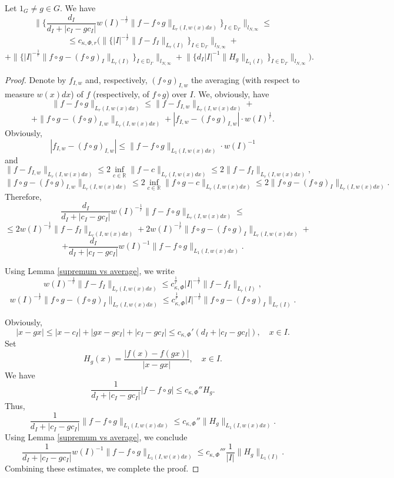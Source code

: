 \documentclass{amsart}
\numberwithin{equation}{section}
\begin{document}
\begin{lemma} Let $1_G\neq g\in G.$ We have
$$\Big\|\Big\{\frac{d_I}{d_I+|c_I-gc_I|}w(I)^{-\frac1r}\|f-f\circ g\|_{L_r(I,w(x)dx)}\Big\}_{I\in\mathbb{D}_{\Gamma}}\Big\|_{l_{N,\infty}}\leq$$
$$\leq c_{\kappa,\Phi,r}\Big(\Big\|\Big\{|I|^{-\frac1r}\|f-f_I\|_{L_r(I)}\Big\}_{I\in\mathbb{D}_{\Gamma}}\Big\|_{l_{N,\infty}}+$$
$$+\Big\|\Big\{|I|^{-\frac1r}\|f\circ g-(f\circ g)_I\|_{L_r(I)}\Big\}_{I\in\mathbb{D}_{\Gamma}}\Big\|_{l_{N,\infty}}+\Big\|\Big\{d_I|I|^{-1}\|H_g\|_{L_1(I)}\Big\}_{I\in\mathbb{D}_{\Gamma}}\Big\|_{l_{N,\infty}}\Big).$$
\end{lemma}
\begin{proof} Denote by $f_{I,w}$ and, respectively, $(f\circ g)_{I,w}$ the averaging (with respect to measure $w(x)dx$) of $f$ (respectively, of $f\circ g$) over $I.$ We, obviously, have
$$\|f-f\circ g\|_{L_r(I,w(x)dx)}\leq\|f-f_{I,w}\|_{L_r(I,w(x)dx)}+$$
$$+\|f\circ g-(f\circ g)_{I,w}\|_{L_r(I,w(x)dx)}+|f_{I,w}-(f\circ g)_{I,w}|\cdot w(I)^{\frac1r}.$$
Obviously,
$$|f_{I,w}-(f\circ g)_{I,w}|\leq\|f-f\circ g\|_{L_1(I,w(x)dx)}\cdot w(I)^{-1}$$
and
$$\|f-f_{I,w}\|_{L_r(I,w(x)dx)}\leq 2\inf_{c\in\mathbb{R}}\|f-c\|_{L_r(I,w(x)dx)}\leq2\|f-f_I\|_{L_r(I,w(x)dx)},$$
$$\|f\circ g-(f\circ g)_{I,w}\|_{L_r(I,w(x)dx)}\leq 2\inf_{c\in\mathbb{R}}\|f\circ g-c\|_{L_r(I,w(x)dx)}\leq2\|f\circ g-(f\circ g)_I\|_{L_r(I,w(x)dx)}.$$
Therefore,
$$\frac{d_I}{d_I+|c_I-gc_I|}w(I)^{-\frac1r}\|f-f\circ g\|_{L_r(I,w(x)dx)}\leq$$
$$\leq 2w(I)^{-\frac1r}\|f-f_I\|_{L_r(I,w(x)dx)}+2w(I)^{-\frac1r}\|f\circ g-(f\circ g)_I\|_{L_r(I,w(x)dx)}+$$
$$+\frac{d_I}{d_I+|c_I-gc_I|}w(I)^{-1}\|f-f\circ g\|_{L_1(I,w(x)dx)}.$$

Using Lemma \ref{supremum vs average}, we write
$$w(I)^{-\frac1r}\|f-f_I\|_{L_r(I,w(x)dx)}\leq c_{\kappa,\Phi}^{\frac1r}|I|^{-\frac1r}\|f-f_I\|_{L_r(I)},$$
$$w(I)^{-\frac1r}\|f\circ g-(f\circ g)_I\|_{L_r(I,w(x)dx)}\leq c_{\kappa,\Phi}^{\frac1r}|I|^{-\frac1r}\|f\circ g-(f\circ g)_I\|_{L_r(I)}.$$

Obviously,
$$|x-gx|\leq|x-c_I|+|gx-gc_I|+|c_I-gc_I|\leq c_{\kappa,\Phi}'(d_I+|c_I-gc_I|),\quad x\in I.$$
Set
$$H_g(x)=\frac{|f(x)-f(gx)|}{|x-gx|},\quad x\in I.$$
We have
$$\frac1{d_I+|c_I-gc_I|}|f-f\circ g|\leq c_{\kappa,\Phi}''H_g.$$
Thus,
$$\frac1{d_I+|c_I-gc_I|}\|f-f\circ g\|_{L_1(I,w(x)dx)}\leq c_{\kappa,\Phi}''\|H_g\|_{L_1(I,w(x)dx)}.$$
Using Lemma \ref{supremum vs average}, we conclude
$$\frac1{d_I+|c_I-gc_I|}w(I)^{-1}\|f-f\circ g\|_{L_1(I,w(x)dx)}\leq c_{\kappa,\Phi}'''\frac1{|I|}\|H_g\|_{L_1(I)}.$$
Combining these estimates, we complete the proof.
\end{proof}
\end{document}
